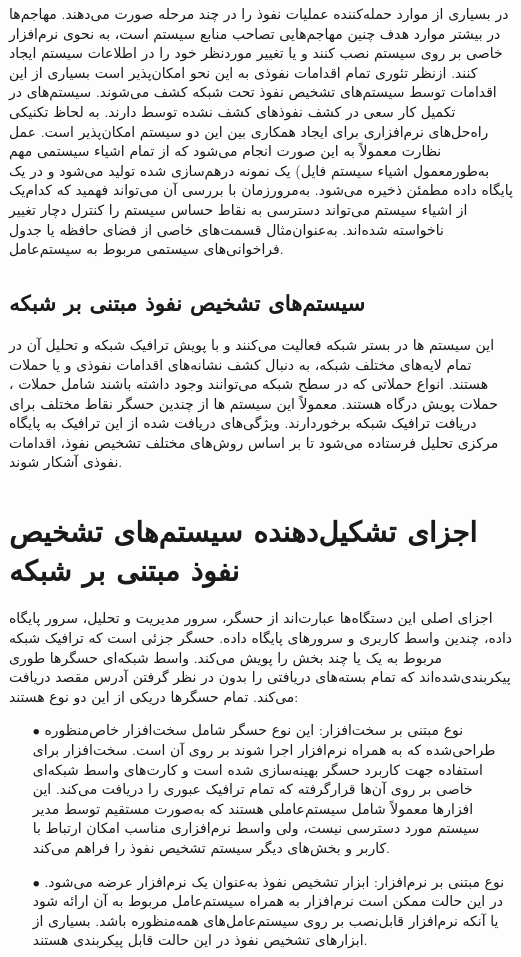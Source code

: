 \documentclass[a4paper,oneside,12pt]{report}
\begin{document}
 در بسیاری از موارد حمله‌کننده عملیات نفوذ را در چند مرحله صورت می‌دهند. مهاجم‌ها در بیشتر موارد هدف چنین مهاجم‌هایی تصاحب منابع سیستم است، به نحوی نرم‌افزار خاصی بر روی سیستم نصب کنند و یا تغییر موردنظر خود را در اطلاعات سیستم ایجاد کنند. ازنظر تئوری تمام اقدامات نفوذی به این نحو امکان‌پذیر است بسیاری از این اقدامات توسط سیستم‌های تشخیص نفوذ تحت شبکه
 کشف می‌شوند. سیستم‌های 
 در تکمیل کار 
 سعی در کشف نفوذهای کشف نشده توسط 
 دارند. به لحاظ تکنیکی راه‌حل‌های نرم‌افزاری برای ایجاد همکاری بین این دو سیستم امکان‌پذیر است.
 عمل نظارت معمولاً به این صورت انجام می‌شود که از تمام اشیاء سیستمی مهم به‌طورمعمول اشیاء سیستم فایل) یک نمونه درهم‌سازی شده تولید می‌شود و در یک پایگاه داده مطمئن ذخیره می‌شود. به‌مرورزمان با بررسی آن می‌تواند فهمید که کدام‌یک از اشیاء سیستم می‌تواند دسترسی به نقاط حساس سیستم را کنترل 
 دچار تغییر ناخواسته شده‌اند. به‌عنوان‌مثال قسمت‌های خاصی از فضای حافظه یا جدول فراخوانی‌های سیستمی مربوط به سیستم‌عامل.
\subsection{سیستم‌های تشخیص نفوذ مبتنی بر شبکه}
 این سیستم ها در بستر شبکه فعالیت می‌کنند و با پویش ترافیک شبکه و تحلیل آن در تمام لایه‌های مختلف شبکه، به دنبال کشف نشانه‌های اقدامات نفوذی و یا حملات هستند. انواع حملاتی که در سطح شبکه می‌توانند وجود داشته باشند شامل حملات 
 ، 
 حملات پویش درگاه هستند. معمولاً این سیستم ها از چندین حسگر نقاط مختلف برای دریافت ترافیک شبکه برخوردارند. ویژگی‌های دریافت شده از این ترافیک به پایگاه مرکزی تحلیل فرستاده می‌شود تا بر اساس روش‌های مختلف تشخیص نفوذ، اقدامات نفوذی آشکار شوند.
 \section{اجزای تشکیل‌دهنده سیستم‌های تشخیص نفوذ مبتنی بر شبکه}
 اجزای اصلی این دستگاه‌ها عبارت‌اند از حسگر، سرور مدیریت و تحلیل، سرور پایگاه داده، چندین واسط کاربری و سرورهای پایگاه داده. حسگر جزئی است که ترافیک شبکه مربوط به یک یا چند بخش را پویش می‌کند. واسط شبکه‌ای حسگرها طوری پیکربندی‌شده‌اند که تمام بسته‌های دریافتی را بدون در نظر گرفتن آدرس مقصد دریافت می‌کند. تمام حسگرها دریکی از این دو نوع هستند:
 \begin{itemize}
 \item[$\bullet$]
 نوع مبتنی بر سخت‌افزار: این نوع حسگر شامل سخت‌افزار خاص‌منظوره طراحی‌شده که به همراه نرم‌افزار اجرا شوند بر روی آن است. سخت‌افزار برای استفاده جهت کاربرد حسگر بهینه‌سازی شده است و کارت‌های واسط شبکه‌ای خاصی بر روی آن‌ها قرارگرفته که تمام ترافیک عبوری را دریافت می‌کند. این افزارها معمولاً شامل سیستم‌عاملی هستند که به‌صورت مستقیم توسط مدیر سیستم مورد دسترسی نیست، ولی واسط نرم‌افزاری مناسب امکان ارتباط با کاربر و بخش‌های دیگر سیستم تشخیص نفوذ را فراهم می‌کند.
 \item[$\bullet$]
 نوع مبتنی بر نرم‌افزار: ابزار تشخیص نفوذ به‌عنوان یک نرم‌افزار عرضه می‌شود. در این حالت ممکن است نرم‌افزار به همراه سیستم‌عامل مربوط به آن ارائه شود یا آنکه نرم‌افزار قابل‌نصب بر روی سیستم‌عامل‌های همه‌منظوره باشد. بسیاری از ابزارهای تشخیص نفوذ در این حالت قابل پیکربندی هستند.
 \end{itemize}
\end{document}
